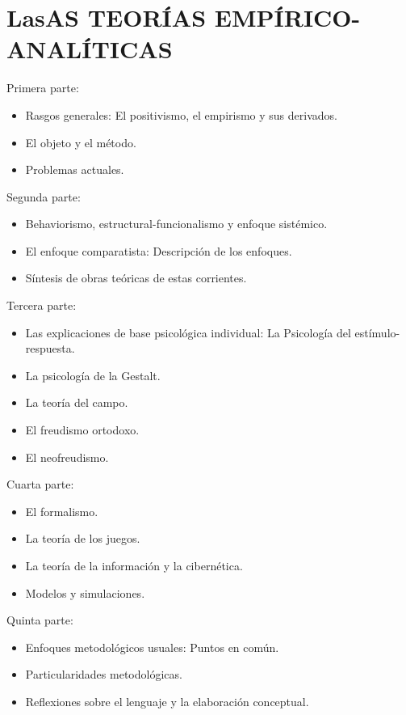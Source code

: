 \documentclass[
]{book}
\providecommand{\tightlist}{%
  \setlength{\itemsep}{0pt}\setlength{\parskip}{0pt}}
\begin{document}
\hypertarget{Lasteoruxedasnormativas}{%
\chapter{LasAS TEORÍAS EMPÍRICO-ANALÍTICAS}\label{Lasteoruxedasnormativas}}

Primera parte:

\begin{itemize}
\tightlist
\item
  Rasgos generales: El positivismo, el empirismo y sus derivados.
\item
  El objeto y el método.
\item
  Problemas actuales.
\end{itemize}

Segunda parte:

\begin{itemize}
\tightlist
\item
  Behaviorismo, estructural-funcionalismo y enfoque sistémico.
\item
  El enfoque comparatista: Descripción de los enfoques.
\item
  Síntesis de obras teóricas de estas corrientes.
\end{itemize}

Tercera parte:

\begin{itemize}
\tightlist
\item
  Las explicaciones de base psicológica individual: La Psicología del estímulo-respuesta.
\item
  La psicología de la Gestalt.
\item
  La teoría del campo.
\item
  El freudismo ortodoxo.
\item
  El neofreudismo.
\end{itemize}

Cuarta parte:

\begin{itemize}
\tightlist
\item
  El formalismo.
\item
  La teoría de los juegos.
\item
  La teoría de la información y la cibernética.
\item
  Modelos y simulaciones.
\end{itemize}

Quinta parte:

\begin{itemize}
\tightlist
\item
  Enfoques metodológicos usuales: Puntos en común.
\item
  Particularidades metodológicas.
\item
  Reflexiones sobre el lenguaje y la elaboración conceptual.
\end{itemize}
\end{document}
